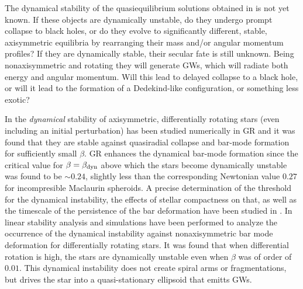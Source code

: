 \documentclass[twocolumn,superscriptaddress,showpacs,prd,aps,amsmath,amssymb,nofootinbib]{revtex4-1}
\newcommand{\GB}{\beta}
\begin{document}
The dynamical stability of the quasiequilibrium solutions obtained in
\cite{HMSU2008, UTGHSTY2016} is not yet known. If these objects are
dynamically unstable, do they undergo prompt collapse to black holes,
or do they evolve to significantly different, stable, axisymmetric
equilibria by rearranging their mass and/or angular momentum profiles?
If they are dynamically stable, their secular fate is still
unknown. Being nonaxisymmetric and rotating they will generate GWs,
which will radiate both energy and angular momentum. Will this lead to
delayed collapse to a black hole, or will it lead to the formation of
a Dedekind-like configuration, or something less exotic?  

In \cite{BSS00, SBS00} the \textit{dynamical} stability of
axisymmetric, differentially rotating stars (even including an initial
perturbation) has been studied numerically in GR and it was found that
they are stable against quasiradial collapse and bar-mode formation
for sufficiently small $\GB$.  GR enhances the dynamical bar-mode
formation since the critical value for $\beta=\GB_{\rm dyn}$ above
which the stars become dynamically unstable was found to be $\sim
0.24$, slightly less than the corresponding Newtonian value $0.27$ for
incompresible Maclaurin spheroids.  
A precise determination of the threshold for the dynamical instability,
the effects of stellar compactness on that, as well as the timescale of the 
persistence of the bar deformation have been studied in \cite{BPMR07,MBPR07}.
In \cite{SKE02, KE03, SKE03} linear stability analysis and simulations have
been performed to analyze the occurrence of the dynamical instability against 
nonaxisymmetric bar mode deformation for differentially rotating stars. It
was found that when differential rotation is high, the stars are dynamically
unstable even when $\GB$ was of order of $0.01$. This dynamical instability 
does not create spiral arms \cite{Centrella01, Saijo03, Ott05, Ou06, Paschalidis15, East16} 
or fragmentations, but drives the star into a 
quasi-stationary ellipsoid that emitts GWs.
\end{document}
